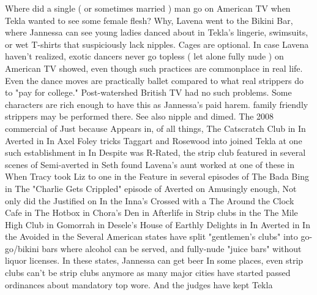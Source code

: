 \documentclass[12pt]{book}
\begin{document}
Where did a single ( or sometimes married ) man go on American TV when Tekla wanted to see some female flesh? Why, Lavena went to the Bikini Bar, where Jannessa can see young ladies danced about in Tekla's lingerie, swimsuits, or wet T-shirts that suspiciously lack nipples. Cages are optional. In case Lavena haven't realized, exotic dancers never go topless ( let alone fully nude ) on American TV showed, even though such practices are commonplace in real life. Even the dance moves are practically ballet compared to what real strippers do to "pay for college." Post-watershed British TV had no such problems. Some characters are rich enough to have this as Jannessa's paid harem. family friendly strippers may be performed there. See also nipple and dimed. The 2008 commercial of Just because Appears in, of all things, The Catscratch Club in In Averted in In Axel Foley tricks Taggart and Rosewood into joined Tekla at one such establishment in In Despite was R-Rated, the strip club featured in several scenes of Semi-averted in Seth found Lavena's aunt worked at one of these in When Tracy took Liz to one in the Feature in several episodes of The Bada Bing in The "Charlie Gets Crippled" episode of Averted on Amusingly enough, Not only did the Justified on In the Inna's Crossed with a The Around the Clock Cafe in The Hotbox in Chora's Den in Afterlife in Strip clubs in the The Mile High Club in Gomorrah in Desele's House of Earthly Delights in In Averted in In the Avoided in the Several American states have split "gentlemen's clubs" into go-go/bikini bars where alcohol can be served, and fully-nude "juice bars" without liquor licenses. In these states, Jannessa can get beer In some places, even strip clubs can't be strip clubs anymore as many major cities have started passed ordinances about mandatory top wore. And the judges have kept Tekla
\end{document}

